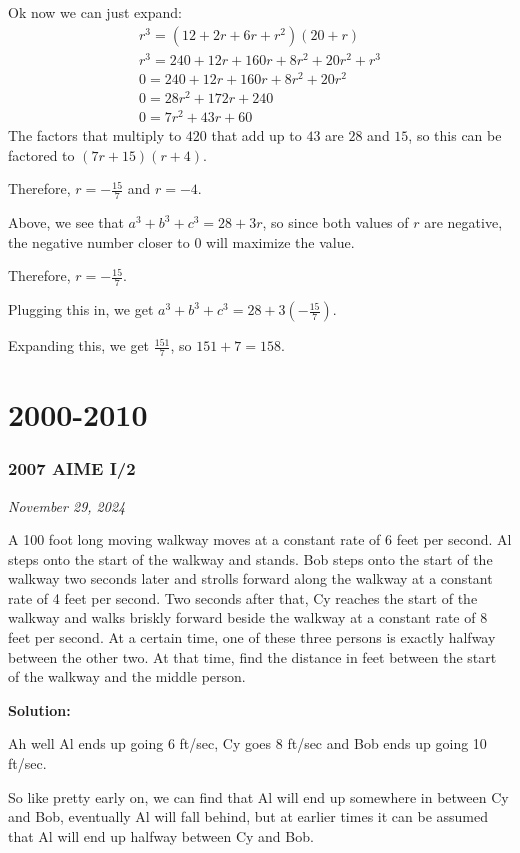 \documentclass[../mathproblems.tex]{subfiles}
\begin{document}
Ok now we can just expand:
\begin{align*} r^3=(12+2r+6r+r^2)(20+r)\\ r^3=240+12r+160r+8r^2+20r^2+r^3\\ 0=240+12r+160r+8r^2+20r^2\\ 0=28r^2+172r+240\\ 0=7r^2+43r+60 \end{align*}The factors that multiply to $420$ that add up to $43$ are $28$ and $15$, so this can be factored to $(7r+15)(r+4)$.

Therefore, $r=-\frac{15}{7}$ and $r=-4$.

Above, we see that $a^3+b^3+c^3=28+3r$, so since both values of $r$ are negative, the negative number closer to 0 will maximize the value.

Therefore, $r=-\frac{15}{7}$.

Plugging this in, we get $a^3+b^3+c^3 = 28+3\left(-\frac{15}{7}\right)$.

Expanding this, we get $\frac{151}{7}$, so $151+7=\boxed{158}$.

\noindent\hrulefill
\section{2000-2010}
\subsubsection*{2007 AIME I/2} 
\textit{November 29, 2024}

A 100 foot long moving walkway moves at a constant rate of 6 feet per second. Al steps onto the start of the walkway and stands. Bob steps onto the start of the walkway two seconds later and strolls forward along the walkway at a constant rate of 4 feet per second. Two seconds after that, Cy reaches the start of the walkway and walks briskly forward beside the walkway at a constant rate of 8 feet per second. At a certain time, one of these three persons is exactly halfway between the other two. At that time, find the distance in feet between the start of the walkway and the middle person.

\textbf{Solution:}

Ah well Al ends up going 6 ft/sec, Cy goes 8 ft/sec and Bob ends up going 10 ft/sec.

So like pretty early on, we can find that Al will end up somewhere in between Cy and Bob, eventually Al will fall behind, but at earlier times it can be assumed that Al will end up halfway between Cy and Bob.
\end{document}
